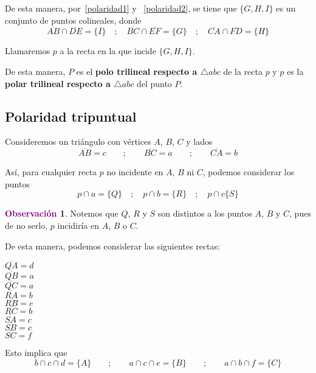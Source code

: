 \documentclass[12pt]{book}
\theoremstyle{definition}
\newtheorem{obs}[teo]{\textcolor{purple}{Observación}}
\begin{document}
De esta manera, por~\ref{polaridad1} y ~\ref{polaridad2}, se tiene que $\{G,H, I\}$ es un conjunto de puntos colineales, donde
$$\overline{AB} \cap \overline{DE} = \{I\} \quad; \quad \overline{BC} \cap \overline{EF} = \{G\} \quad ; \quad \overline{CA} \cap \overline{FD} = \{H\}$$

Llamaremos $p$ a la recta en la que incide $\{G,H,I\}$.

De esta manera, $P$ es el \textbf{polo trilineal respecto a $\triangle abc$} de la recta $p$ y $p$ es la \textbf{polar trilineal respecto a $\triangle abc$} del punto $P$.


\subsection{Polaridad tripuntual}

Consideremos un triángulo con vértices $A$, $B$, $C$ y lados
$$\overline{AB}= c \qquad ; \qquad \overline{BC} = a \qquad ; \qquad \overline{CA}= b $$

Así, para cualquier recta $p$ no incidente en $A$, $B$ ni $C$, podemos considerar los puntos
$$ p \cap a = \{Q\} \quad ; \quad p \cap b =\{R\} \quad ; \quad p \cap c \{S\}$$

\begin{obs}
Notemos que $Q$, $R$ y $S$ son distintos a los puntos $A$, $B$ y $C$, pues de no serlo, $p$ incidiría en $A$, $B$ o $C$.
\end{obs}

De esta manera, podemos considerar las siguientes rectas:
\begin{center}
\begin{multicols}{3}
$\overline{QA}= d$\\
$\overline{QB}= a$\\
$\overline{QC}= a$\\
$\overline{RA}= b$\\
$\overline{RB}= e$\\
$\overline{RC}= b$\\
$\overline{SA}= c$\\
$\overline{SB}= c$\\
$\overline{SC}= f$
\end{multicols}
\end{center}

Esto implica que
$$ b \cap c \cap d = \{A\} \qquad ; \qquad a \cap c \cap e =\{B\} \qquad ; \qquad a \cap b \cap f = \{C\}$$
\end{document}
